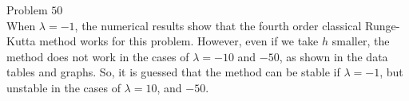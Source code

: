 \documentclass[dvipdfmx]{article}
\begin{document}
Problem $50$\\
When $\lambda = -1$, the numerical results show that the fourth order classical Runge-Kutta method works for this problem. However, even if we take $h$ smaller, the method does not work in the cases of $\lambda = -10$ and $-50$, as shown in the data tables and graphs. So, it is guessed that the method can be stable if $\lambda = -1$, but unstable in the cases of $\lambda = 10$, and $-50$.
\end{document}

